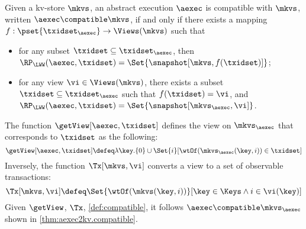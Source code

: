 \begin{definition}
\label{def:compatible}
Given a kv-store $\mkvs$,
an abstract execution $\aexec$ is compatible with $\mkvs$, written 
$\aexec \compatible \mkvs$, if and only if there exists a  mapping 
$f: \pset{\txidset_{\aexec}} \rightarrow \Views(\mkvs)$
such that  
\begin{itemize}
\item for any subset $\txidset \subseteq \txidset_{\aexec}$, then $\RP_{\LWW}(\aexec, \txidset) = \Set{\snapshot[\mkvs, f(\txidset)]}$; 
\item for any view $\vi \in \Views(\mkvs)$, there exists a subset $\txidset \subseteq \txidset_{\aexec}$ 
such that $f(\txidset) = \vi$, and $\RP_{\LWW}(\aexec, \txidset) = \Set{\snapshot[\mkvs_{\aexec}, \vi]}$.
\end{itemize}
\end{definition}

The function $\getView[\aexec, \txidset]$ defines the view on \( \mkvs_\aexec \) that corresponds to \( \txidset \) as the following:
\[
    \getView[\aexec, \txidset] \defeq \lambda \key. \{0\} \cup \Set{i}[\wtOf(\mkvs_{\aexec}(\key, i)) \in \txidset]
\]
Inversely, the function \( \Tx[\mkvs, \vi] \) converts a view to a set of observable transactions:
\[
    \Tx[\mkvs, \vi] \defeq \Set{\wtOf(\mkvs(\key, i))}[\key \in \Keys \land i \in \vi(\key)]
\]
Given \( \getView \), \( \Tx \), \cref{def:compatible}, 
it follows \( \aexec \compatible \mkvs_{\aexec} \) shown in \cref{thm:aexec2kv.compatible}.

